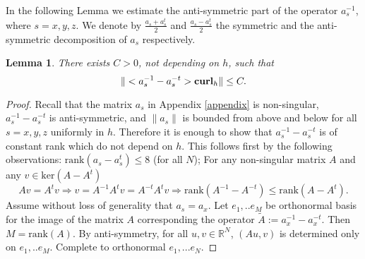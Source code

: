 \documentclass[12pt,reqno]{amsart}
\newcommand{\R}{\mathbb{R}}
\newcommand{\curl}{{\bf curl}}
\newcommand{\e}{{\bf E}}
\newtheorem{lem}[theorem]{Lemma}
\theoremstyle{definition}
\numberwithin{equation}{section}
\def\Gwh{\Omega_h}
\begin{document}
In the following Lemma we estimate the anti-symmetric part of the operator $a_s^{-1}$, where $s=x,y,z$.
    We denote by $\frac{a_s+a_s^t}{2}$ and $\frac{a_s-a_s^t}{2}$ the symmetric and the anti-symmetric decomposition of $a_s$ respectively.
\begin{lem}\label{lem:antiestimates}
	There exists $C>0$, not depending on $h$, such that $$\|<a_s^{-1}-a_s^{-t}>\curl_h\|\leq C.$$
\end{lem}
\begin{proof}
	Recall that the matrix  $a_s $ in Appendix \ref{appendix} is non-singular,  $a_s^{-1}-a_s^{-t}$ is anti-symmetric, and $\|a_s\|$  is bounded from above and below for all $s=x,y,z$ uniformly in $h$. Therefore it is enough to show that $a_s^{-1}-a_s^{-t}$ is of constant rank which do not depend on $h$. This follows  first by the following  observations: 
	$\mathrm{rank}(a_s-a_s^t)\leq 8$ (for all $N$); For any non-singular matrix $A$ and any $v\in \mathrm{ker}(A-A^t)$
	$$
	Av=A^tv \Rightarrow v=A^{-1}A^{t}v=A^{-t}A^{t}v\Rightarrow
	\mathrm{rank}(A^{-1}-A^{-t})\leq 	\mathrm{rank}(A-A^t).
	$$
	Assume without loss of generality that $a_s=a_x$. 
% 
 Let $e_1,..e_M$  be orthonormal basis for the image of the matrix $A$ corresponding the operator $\tilde{A}:=a_x^{-1}-a_x^{-t}$.
 Then $M=\mathrm{rank}(A)$.
 By anti-symmetry, for all $u,v\in \R^N $, $(Au,v)$  is determined only on $e_1,..e_M$.
 Complete to orthonormal  $e_1,...e_N$.

\end{proof}
\end{document}
